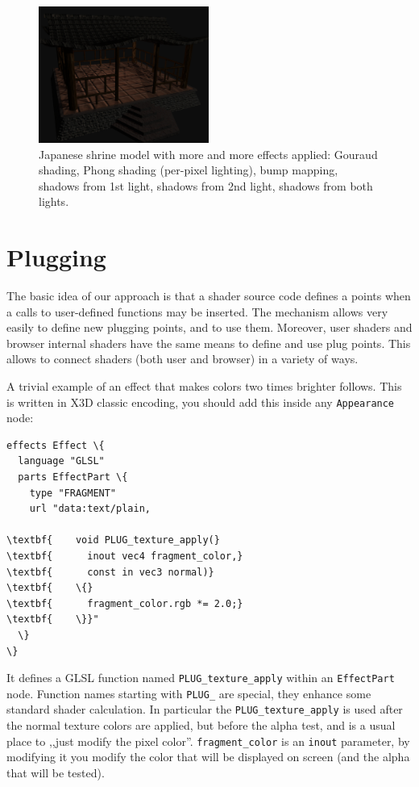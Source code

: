 \documentclass{acmsiggraph}                     %
\begin{document}
\begin{figure}[t]
  \includegraphics[width=2.2in]{rhan_shrine_5_everything}
  \caption{Japanese shrine model with more and more effects applied: Gouraud shading,
Phong shading (per-pixel lighting), bump mapping, shadows from 1st light,
shadows from 2nd light, shadows from both lights.}
\end{figure}

\section{Plugging}

The basic idea of our approach is that a shader source code defines
a points when a calls to user-defined functions may be inserted. The mechanism
allows very easily to define new plugging points, and to use
them. Moreover, user shaders and browser internal shaders have the
same means to define and use plug points. This allows to connect
shaders (both user and browser) in a variety of ways.

A trivial example of an effect that makes colors two times brighter
follows. This is written in X3D classic encoding,
you should add this inside any \texttt{Appearance} node:

\begin{Verbatim}[commandchars=\\\{\},frame=single]
effects Effect \{
  language "GLSL"
  parts EffectPart \{
    type "FRAGMENT"
    url "data:text/plain,

\textbf{    void PLUG_texture_apply(}
\textbf{      inout vec4 fragment_color,}
\textbf{      const in vec3 normal)}
\textbf{    \{}
\textbf{      fragment_color.rgb *= 2.0;}
\textbf{    \}}"
  \}
\}
\end{Verbatim}

It defines a GLSL function named \texttt{PLUG\_texture\_apply}
within an \texttt{EffectPart} node. Function names starting with \texttt{PLUG\_}
are special, they enhance some standard shader calculation. In particular
the \texttt{PLUG\_texture\_apply} is used after the normal texture colors are applied,
but before the alpha test, and is a usual place to ,,just modify the pixel color''.
\texttt{fragment\_color} is an \texttt{inout} parameter, by modifying it
you modify the color that will be displayed on screen (and the alpha that will
be tested).
\end{document}
